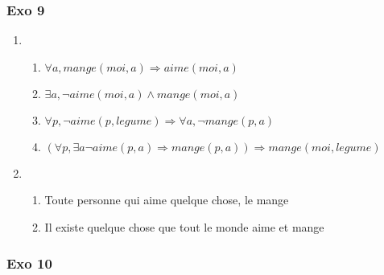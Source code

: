 \documentclass[]{book}
\theoremstyle{definition}
\begin{document}
\subsubsection*{Exo 9}
\begin{enumerate}
\item
\begin{enumerate}
\item $\forall a, mange(moi,a) \Rightarrow aime(moi,a)$
\item $\exists a, \lnot aime(moi, a) \land mange(moi, a)$
\item $\forall p, \lnot aime(p, legume) \Rightarrow \forall a, \lnot mange(p, a)$
\item $(\forall p, \exists a \lnot aime(p, a) \Rightarrow mange(p,a)) \Rightarrow mange(moi, legume)$
\end{enumerate}
\item
\begin{enumerate}
\item Toute personne qui aime quelque chose, le mange
\item Il existe quelque chose que tout le monde aime et mange
\end{enumerate}
\end{enumerate}

\subsubsection*{Exo 10}
\end{document}

